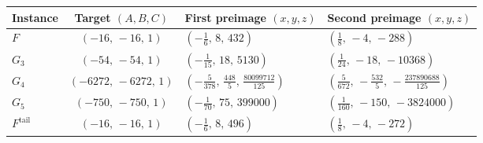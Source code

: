 \begin{tabular}{lcll}
\toprule
Instance & Target $(A,B,C)$ & First preimage $(x,y,z)$ & Second preimage $(x,y,z)$ \\
\midrule
$F$ & $(-16,\,-16,\,1)$ & $(-\tfrac{1}{6},\,8,\,432)$ & $(\tfrac{1}{8},\,-4,\,-288)$ \\
$G_3$ & $(-54,\,-54,\,1)$ & $(-\tfrac{1}{15},\,18,\,5130)$ & $(\tfrac{1}{24},\,-18,\,-10368)$ \\
$G_4$ & $(-6272,\,-6272,\,1)$ & $(-\tfrac{5}{378},\,\tfrac{448}{5},\,\tfrac{80099712}{125})$ & $(\tfrac{5}{672},\,-\tfrac{532}{5},\,-\tfrac{237890688}{125})$ \\
$G_5$ & $(-750,\,-750,\,1)$ & $(-\tfrac{1}{70},\,75,\,399000)$ & $(\tfrac{1}{160},\,-150,\,-3824000)$ \\
$F^{\mathrm{tail}}$ & $(-16,\,-16,\,1)$ & $(-\tfrac{1}{6},\,8,\,496)$ & $(\tfrac{1}{8},\,-4,\,-272)$ \\
\bottomrule
\end{tabular}
